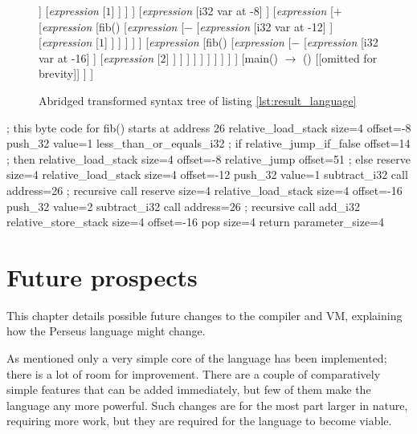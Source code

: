 \begin{figure}
\centering
\begin{forest}
[\textit{file}
	[{fib() $\rightarrow$ i32}
		[\textit{expression}
			[\textit{if}
				[\textit{expression} : bool
					[{$<=$}
						[\textit{expression}
							[i32 var at -8]
						]
						[\textit{expression}
							[$1$]
						]
					]
				]
				[\textit{expression}
					[i32 var at -8]
				]
				[\textit{expression}
					[{$+$}
						[\textit{expression}
							[fib()
								[\textit{expression}
									[{$-$}
										[\textit{expression}
											[i32 var at -12]
										]
										[\textit{expression}
											[$1$]
										]
									]
								]
							]
						]
						[\textit{expression}
							[fib()
								[\textit{expression}
									[{$-$}
										[\textit{expression}
											[i32 var at -16]
										]
										[\textit{expression}
											[$2$]
										]
									]
								]
							]
						]
					]
				]
			]
		]
	]
	[{main() $\rightarrow$ ()}
		[{[omitted for brevity]}]
	]
]
\end{forest}
\caption{Abridged transformed syntax tree of listing \ref{lst:result_language}}
\label{fig:result_language_transformed_tree}
\end{figure}

\begin{codelisting}[caption="Byte code translation of function fib() in listing \ref{lst:result_language}",label={lst:result_bytecode}]
; this byte code for fib() starts at address 26
relative_load_stack size=4 offset=-8
push_32 value=1
less_than_or_equals_i32
; if
relative_jump_if_false offset=14
; then
	relative_load_stack size=4 offset=-8
	relative_jump offset=51
; else
	reserve size=4
	relative_load_stack size=4 offset=-12
	push_32 value=1
	subtract_i32
	call address=26 ; recursive call
	reserve size=4
	relative_load_stack size=4 offset=-16
	push_32 value=2
	subtract_i32
	call address=26 ; recursive call
	add_i32
relative_store_stack size=4 offset=-16
pop size=4
return parameter_size=4
\end{codelisting}

\chapter{Future prospects}
This chapter details possible future changes to the compiler and VM, explaining how the Perseus language might change.

As mentioned only a very simple core of the language has been implemented; there is a lot of room for improvement. There are a couple of comparatively simple features that can be added immediately, but few of them make the language any more powerful. Such changes are for the most part larger in nature, requiring more work, but they are required for the language to become viable.

